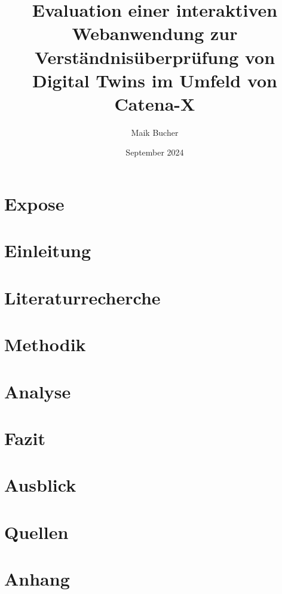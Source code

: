 \documentclass{article}
\title{Evaluation einer interaktiven Webanwendung zur Verständnisüberprüfung von Digital Twins im Umfeld von Catena-X}
\author{Maik Bucher }
\date{September 2024}
\begin{document}
\maketitle

\section*{Expose}
\tableofcontents
\section{Einleitung}
\section{Literaturrecherche}
\section{Methodik}
\section{Analyse}
\section{Fazit}
\section{Ausblick}
\section{Quellen}
\section{Anhang}
\end{document}
